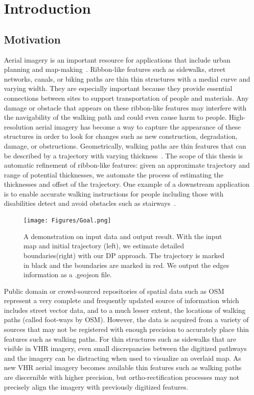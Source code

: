 \chapter{Introduction}\label{sec:introduction}

\section{Motivation}\label{sec:motivation}
Aerial imagery is an important resource for applications that include urban planning and map-making~\cite{5523977}.
Ribbon-like features such as sidewalks, street networks, canals, or biking paths are thin thin structures with a medial
curve and varying width. They are especially important because they provide essential connections between sites to
support transportation of people and materials. Any damage or obstacle that appears on these ribbon-like features may
interfere with the navigability of the walking path and could even cause harm to people. High-resolution aerial imagery
has become a way to capture the appearance of these structures in order to look for changes such as new construction,
degradation, damage, or obstructions. Geometrically, walking paths are thin features that can be described by a
trajectory with varying thickness~\cite{10.1007/11744078_9}. The scope of this thesis is automatic refinement of
ribbon-like features: given an approximate trajectory and range of potential thicknesses, we automate the process of
estimating the thicknesses and offset of the trajectory. One example of a downstream application is to enable accurate
walking instructions for people including those with disabilities detect and avoid obstacles such as stairways~\cite{ZOU2012227}.

\begin{figure} 
\centering 
\texttt{[image: Figures/Goal.png]} 
\caption[Objective Demonstration]{
A demonstration  on input data and output result. 
With the input map and initial trajectory (left), 
we estimate detailed boundaries(right) with our \ac{DP} approach. 
The trajectory is marked in black and the boundaries are marked in red. 
We output the edges information as a .geojson file.}
\label{fig:goal} 
\end{figure}


Public domain or crowd-sourced repositories of spatial data such as \ac{OSM}~\cite{OpenStreetMap} represent a very
complete and frequently updated source of information which includes street vector data, and to a much lesser extent,
the locations of walking paths (called foot-ways by \ac{OSM}). However, the data is acquired from a variety of sources that may not be registered with
enough precision to accurately place thin features such as walking paths. For thin structures such as sidewalks that are
visible in \ac{VHR} imagery, even small discrepancies between the digitized pathways and the imagery can be distracting
when used to visualize an overlaid map. As new \ac{VHR} aerial imagery becomes available thin features such as walking
paths are discernible with higher precision, but ortho-rectification processes may not precisely align the imagery with
previously digitized features.

